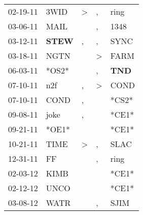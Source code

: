 \begin{supertabular}{p{0.07\textwidth}p{0.06\textwidth}p{0.02\textwidth}p{0.02\textwidth}p{0.06\textwidth}}
          02-19-11\textsuperscript{} &           3WID\textsuperscript{} &     \textgreater &                , &           ring\textsuperscript{} \\
          03-06-11\textsuperscript{} &           MAIL\textsuperscript{} &                  &                , &           1348\textsuperscript{} \\
          03-12-11\textsuperscript{} &  \textbf{STEW\textsuperscript{}} &                , &                , &           SYNC\textsuperscript{} \\
          03-18-11\textsuperscript{} &           NGTN\textsuperscript{} &                  &     \textgreater &           FARM\textsuperscript{} \\
          06-03-11\textsuperscript{} &                            *OS2* &                  &                , &   \textbf{TND\textsuperscript{}} \\
          07-10-11\textsuperscript{} &            n2f\textsuperscript{} &                , &     \textgreater &           COND\textsuperscript{} \\
          07-10-11\textsuperscript{} &           COND\textsuperscript{} &                , &                  &                            *CS2* \\
          09-08-11\textsuperscript{} &           joke\textsuperscript{} &                , &                  &                            *CE1* \\
          09-21-11\textsuperscript{} &                            *OE1* &                  &                  &                            *CE1* \\
          10-21-11\textsuperscript{} &           TIME\textsuperscript{} &     \textgreater &                , &           SLAC\textsuperscript{} \\
          12-31-11\textsuperscript{} &             FF\textsuperscript{} &                  &                , &           ring\textsuperscript{} \\
          02-03-12\textsuperscript{} &           KIMB\textsuperscript{} &                  &                  &                            *CE1* \\
          02-12-12\textsuperscript{} &           UNCO\textsuperscript{} &                  &                  &                            *CE1* \\
          03-08-12\textsuperscript{} &           WATR\textsuperscript{} &                  &                , &           SJIM\textsuperscript{} \\

\end{supertabular}
